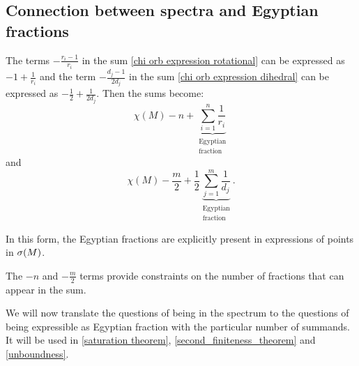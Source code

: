 \subsection{Connection between spectra and Egyptian fractions}\label{Egyptian_fractions}
The terms $-\frac{r_i-1}{r_i}$ in the sum \ref{chi orb expression rotational} 
can be expressed as $-1+ \frac{1}{r_i}$ 
and the term $-\frac{d_j-1}{2d_j}$ in the sum \ref{chi orb expression dihedral} can be expressed as 
$-\frac{1}{2} + \frac{1}{2d_j}$. 
Then the sums become:
\begin{equation}\label{Egyptian S2 sum}
\chi(M) - n + \underbrace{\sum_{i=1}^n \frac{1}{r_i}}_{
\substack{\textrm{Egyptian} \\ \textrm{fraction}}}
\end{equation}
and
\begin{equation}\label{Egyptian D2 sum}
\chi(M) - \frac{m}{2} + \frac{1}{2}
\underbrace{\sum_{j=1}^m \frac{1}{d_j}}_{
\substack{\textrm{Egyptian} \\\textrm{fraction}}}.
\end{equation}

In this form, the Egyptian fractions are explicitly present in expressions of 
points in ${{\sigma}(M)}$.

The $-n$ and $-\frac{m}{2}$ terms provide constraints on the number of fractions that 
can appear in the sum.

We will now translate the questions of being in the spectrum 
to the questions of being expressible as Egyptian fraction with the particular number 
of summands. It will be used in \ref{saturation theorem}, 
\ref{second_finiteness_theorem} and \ref{unboundness}.

